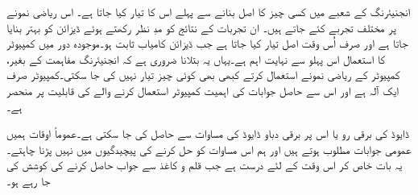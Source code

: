 	انجنیئرنگ کے شعبے میں کسی چیز کا اصل بنانے سے پہلے اس کا  تیار کیا جاتا ہے۔ اس ریاضی نمونے پر مختلف تجربے کئے جاتے ہیں۔ ان تجربات کے نتائج کو مدِ نظر رکھتے ہوئے ڈیزائن کو بہتر بنایا جاتا ہے اور صرف اُس وقت اصل تیار کیا جاتا ہے جب ڈیزائن کامیاب ثابت ہو۔موجودہ دور میں  کمپیوٹر کا استعمال اس پہلو سے نہایت اہم ہے۔یہاں یہ بتلانا ضروری ہے کہ انجنیئرنگ مفاہمت کے بغیر، کمپیوٹر کے ریاضی نمونے استعمال کرتے کبھی بھی کوئی چیز تیار نہیں کی جا سکتی۔کمپیوٹر صرف ایک آلہ ہے اور اس سے حاصل جوابات کی اہمیت کمپیوٹر استعمال کرنے والے کی قابلیت پر منحصر ہے۔

ڈایوڈ کی برقی رو یا اس پر برقی دباو ڈایوڈ کی مساوات سے حاصل کی جا سکتی ہے۔عموماً اوقات ہمیں عمومی جوابات مطلوب ہوتے ہیں اور ہم اس مساوات کو حل کرنے کی پیچیدگیوں میں نہیں پڑنا چاہتے۔یہ بات خاص کر اس وقت کے لئے درست ہے جب قلم و کاغذ سے جواب حاصل کرنے کی کوشش کی جا رہے ہو۔

